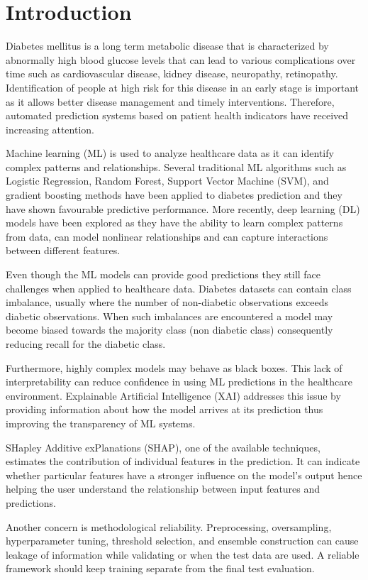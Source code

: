 \documentclass[conference]{IEEEtran}
\begin{document}
\section{Introduction}

Diabetes mellitus is a long term metabolic disease that is characterized by abnormally high blood glucose levels that can lead to various complications over time such as cardiovascular disease, kidney disease, neuropathy, retinopathy. Identification of people at high risk for this disease in an early stage is important as it allows better disease management and timely interventions. Therefore, automated prediction systems based on patient health indicators have received increasing attention.

Machine learning (ML) is used to analyze healthcare data as it can identify complex patterns and relationships. Several traditional ML algorithms such as Logistic Regression, Random Forest, Support Vector Machine (SVM), and gradient boosting methods have been applied to diabetes prediction and they have shown favourable predictive performance. More recently, deep learning (DL) models have been explored as they have the ability to learn complex patterns from data, can model nonlinear relationships and can capture interactions between different features.

Even though the ML models can provide good predictions they still face challenges when applied to healthcare data. Diabetes datasets can contain class imbalance, usually where the number of non-diabetic observations exceeds diabetic observations. When such imbalances are encountered a model may become biased towards the majority class (non diabetic class) consequently reducing recall for the diabetic class.

Furthermore, highly complex models may behave as black boxes. This lack of interpretability can reduce confidence in using ML predictions in the healthcare environment. Explainable Artificial Intelligence (XAI) addresses this issue by providing information about how the model arrives at its prediction thus improving the transparency of ML systems.

SHapley Additive exPlanations (SHAP), one of the available techniques, estimates the contribution of individual features in the prediction. It can indicate whether particular features have a stronger influence on the model's output hence helping the user understand the relationship between input features and predictions.

Another concern is methodological reliability. Preprocessing, oversampling, hyperparameter tuning, threshold selection, and ensemble construction can cause leakage of information while validating or when the test data are used. A reliable framework should keep training separate from the final test evaluation.
\end{document}
